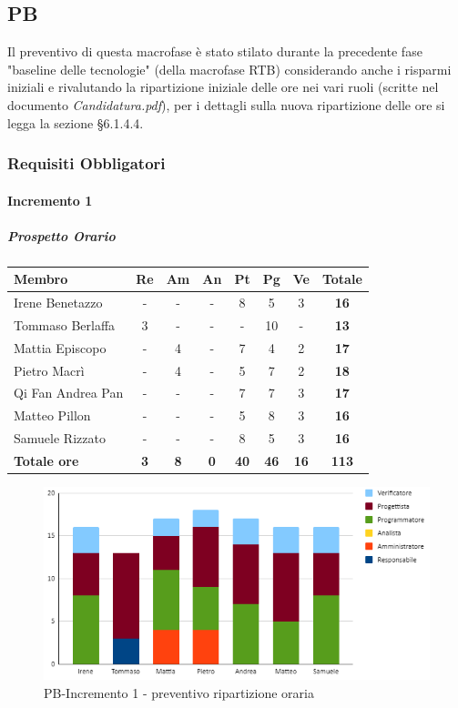 \subsection{PB}
Il preventivo di questa macrofase è stato stilato durante la precedente fase "baseline delle tecnologie" (della macrofase RTB) considerando anche i risparmi iniziali e rivalutando la ripartizione iniziale delle ore nei vari ruoli (scritte nel documento \emph{Candidatura.pdf}), per i dettagli sulla nuova ripartizione delle ore si legga la sezione §6.1.4.4.
\subsubsection{Requisiti Obbligatori}
\paragraph{Incremento 1}
\subparagraph{Prospetto Orario}
\begin{center}
	\renewcommand{\arraystretch}{1.8} %
	\begin{tabular}{ |m{10em}|c|c|c|c|c|c|c| }
	\hline
	\textbf{Membro} & \textbf{Re} & \textbf{Am} &  \textbf{An} &  \textbf{Pt} &  \textbf{Pg} &  \textbf{Ve} &  \textbf{Totale}\\
    \hline
    Irene Benetazzo   & - & - & - & 8 & 5 & 3 & \textbf{16} \\
    \hline
    Tommaso Berlaffa  & 3 & - & - & - & 10 & - & \textbf{13} \\
    \hline
    Mattia Episcopo   & - & 4 & - & 7 & 4 & 2 & \textbf{17} \\
    \hline
    Pietro Macrì      & - & 4 & - & 5 & 7 & 2 & \textbf{18} \\
    \hline
    Qi Fan Andrea Pan & - & - & - & 7 & 7 & 3 & \textbf{17} \\
    \hline
    Matteo Pillon     & - & - & - & 5 & 8 & 3 & \textbf{16} \\
    \hline
    Samuele Rizzato   & - & - & - & 8 & 5 & 3 & \textbf{16} \\
    \hline
    \textbf{Totale ore} & \textbf{3} & \textbf{8} &  \textbf{0} &  \textbf{40} &  \textbf{46} &  \textbf{16} &  \textbf{113}\\
    \hline
	\end{tabular}
\end{center}
\begin{figure}[H]
   \centering\includegraphics{images/preventivo/PB-incremento1-ore.png}
   \caption{PB-Incremento 1 - preventivo ripartizione oraria}
\end{figure}


